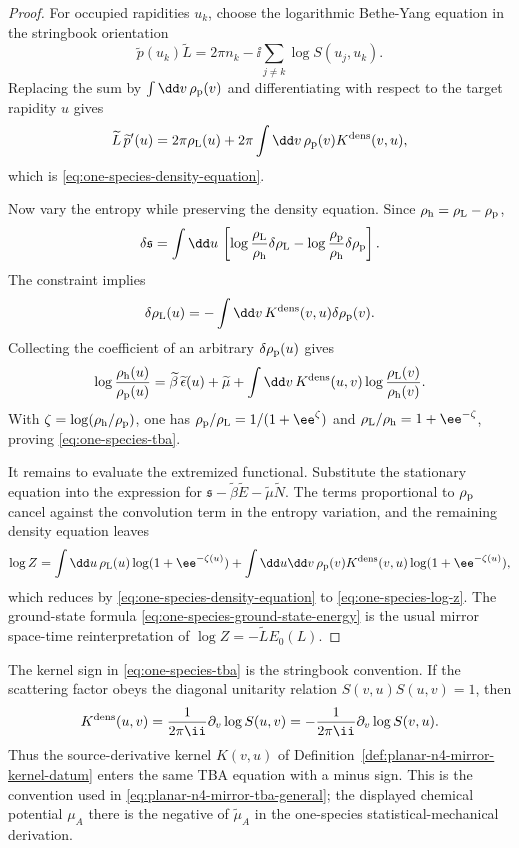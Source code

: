 \begin{proof}
For occupied rapidities \(u_k\), choose the logarithmic Bethe-Yang equation in
the stringbook orientation
\[
  \widetilde p(u_k)\widetilde L
  =
  2\pi n_k
  -
  \ii\sum_{j\neq k}\log S(u_j,u_k).
\]
Replacing the sum by
\(\int\dd v\,\rho_{\rm p}(v)\) and differentiating with respect to the target
rapidity \(u\) gives
\[
  \widetilde L\,\widetilde p'(u)
  =
  2\pi\rho_{\rm L}(u)
  +
  2\pi\int\dd v\,\rho_{\rm p}(v)K^{\rm dens}(v,u),
\]
which is \eqref{eq:one-species-density-equation}.

Now vary the entropy while preserving the density equation.  Since
\(\rho_{\rm h}=\rho_{\rm L}-\rho_{\rm p}\),
\[
  \delta\mathfrak s
  =
  \int\dd u\,
  \left[
    \log\frac{\rho_{\rm L}}{\rho_{\rm h}}\delta\rho_{\rm L}
    -
    \log\frac{\rho_{\rm p}}{\rho_{\rm h}}\delta\rho_{\rm p}
  \right].
\]
The constraint implies
\[
  \delta\rho_{\rm L}(u)
  =
  -
  \int\dd v\,K^{\rm dens}(v,u)\delta\rho_{\rm p}(v).
\]
Collecting the coefficient of an arbitrary
\(\delta\rho_{\rm p}(u)\) gives
\[
  \log\frac{\rho_{\rm h}(u)}{\rho_{\rm p}(u)}
  =
  \widetilde\beta\,\widetilde\epsilon(u)+\widetilde\mu
  +
  \int\dd v\,K^{\rm dens}(u,v)
    \log\frac{\rho_{\rm L}(v)}{\rho_{\rm h}(v)} .
\]
With
\(\zeta=\log(\rho_{\rm h}/\rho_{\rm p})\), one has
\(\rho_{\rm p}/\rho_{\rm L}=1/(1+\ee^\zeta)\) and
\(\rho_{\rm L}/\rho_{\rm h}=1+\ee^{-\zeta}\), proving
\eqref{eq:one-species-tba}.

It remains to evaluate the extremized functional.  Substitute the stationary
equation into the expression for
\(\mathfrak s-\widetilde\beta\widetilde E-\widetilde\mu\widetilde N\).  The
terms proportional to \(\rho_{\rm p}\) cancel against the convolution term in
the entropy variation, and the remaining density equation leaves
\[
  \log Z
  =
  \int\dd u\,\rho_{\rm L}(u)\log(1+\ee^{-\zeta(u)})
  +
  \int\dd u\dd v\,\rho_{\rm p}(v)K^{\rm dens}(v,u)
       \log(1+\ee^{-\zeta(u)}),
\]
which reduces by \eqref{eq:one-species-density-equation} to
\eqref{eq:one-species-log-z}.  The ground-state formula
\eqref{eq:one-species-ground-state-energy} is the usual mirror
space-time reinterpretation of \(\log Z=-\widetilde L E_0(L)\).
\end{proof}

The kernel sign in \eqref{eq:one-species-tba} is the stringbook convention.
If the scattering factor obeys the diagonal unitarity relation
\(S(v,u)S(u,v)=1\), then
\[
  K^{\rm dens}(u,v)
  =
  \frac{1}{2\pi\ii}\partial_v\log S(u,v)
  =
  -
  \frac{1}{2\pi\ii}\partial_v\log S(v,u).
\]
Thus the source-derivative kernel \(K(v,u)\) of
Definition~\ref{def:planar-n4-mirror-kernel-datum} enters the same TBA equation
with a minus sign.  This is the convention used in
\eqref{eq:planar-n4-mirror-tba-general}; the displayed chemical potential
\(\mu_A\) there is the negative of \(\widetilde\mu_A\) in the one-species
statistical-mechanical derivation.

